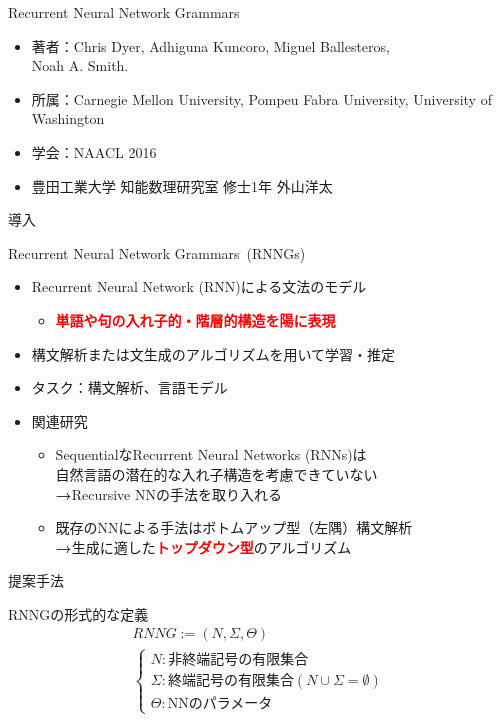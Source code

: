 \documentclass[aspectratio=43,unicode,10pt]{beamer}
\title{\thetitle}
\author{Chris Dyer et al.}
\newcommand{\fire}[1]{\textcolor{red}{\textbf{#1}}}
\newcommand{\arrow}{\textcolor{ttiblue}{\textbf{→}}\hspace{1ex}}
\newcommand{\term}{終端記号}
\newcommand{\nt}{非終端記号}
\newcommand{\thetitle}{Recurrent Neural Network Grammars}
\begin{document}
\begin{frame}{\thetitle}
  \begin{itemize}
    \item 著者：Chris Dyer, Adhiguna Kuncoro, Miguel Ballesteros, \\
                Noah A. Smith.
    \item 所属：Carnegie Mellon University, Pompeu Fabra University, University of Washington
    \item 学会：NAACL 2016
    \item 豊田工業大学 知能数理研究室 修士1年 外山洋太
  \end{itemize}
\end{frame}

\begin{frame}{導入}
  \begin{block}{\thetitle~(RNNGs)}
    \begin{itemize}
      \item Recurrent Neural Network (RNN)による文法のモデル
        \begin{itemize}
          \item \fire{単語や句の入れ子的・階層的構造を陽に表現}
        \end{itemize}
      \item 構文解析または文生成のアルゴリズムを用いて学習・推定
      \item タスク：構文解析、言語モデル
      \item 関連研究
        \begin{itemize}
          \item SequentialなRecurrent Neural Networks (RNNs)は \\
                自然言語の潜在的な入れ子構造を考慮できていない \\
                \arrow Recursive NNの手法を取り入れる
          \item 既存のNNによる手法はボトムアップ型（左隅）構文解析 \\
                \arrow 生成に適した\fire{トップダウン型}のアルゴリズム
        \end{itemize}
    \end{itemize}
  \end{block}
\end{frame}

\begin{frame}{提案手法}
  \begin{block}{RNNGの形式的な定義}
    \begin{gather*}
      RNNG := (N, \Sigma, \Theta) \\
      \begin{cases}
        N: \text{\nt の有限集合} \\
        \Sigma: \text{\term の有限集合} (N \cup \Sigma = \emptyset) \\
        \Theta: \text{NNのパラメータ}
      \end{cases}
    \end{gather*}
  \end{block}
\end{frame}
\end{document}

